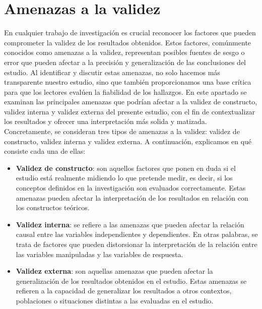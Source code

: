 \section{Amenazas a la validez}
En cualquier trabajo de investigación es crucial reconocer los factores que pueden comprometer
la validez de los resultados obtenidos. Estos factores, comúnmente conocidos como amenazas a la
validez, representan posibles fuentes de sesgo o error que pueden afectar a la precisión y
generalización de las conclusiones del estudio. Al identificar y discutir estas amenazas, no solo
hacemos más transparente nuestro estudio, sino que también proporcionamos una base crítica para
que los lectores evalúen la fiabilidad de los hallazgos. En este apartado se examinan las
principales amenazas que podrían afectar a la validez de constructo, validez interna y validez
externa del presente estudio, con el fin de contextualizar los resultados y ofrecer una
interpretación más solida y matizada.\\

Concretamente, se consideran tres tipos de amenazas a la validez: validez de constructo, validez
interna y validez externa. A continuación, explicamos en qué consiste cada una de ellas:

\begin{itemize}
    \item \textbf{Validez de constructo}: son aquellos factores que ponen en duda si el estudio
    está realmente midiendo lo que pretende medir, es decir, si los conceptos definidos en la
    investigación son evaluados correctamente. Estas amenazas pueden afectar la interpretación
    de los resultados en relación con los constructos teóricos.\\

    \item \textbf{Validez interna}: se refiere a las amenazas que pueden afectar la relación
    causal entre las variables independientes y dependientes. En otras palabras, se trata de
    factores que pueden distorsionar la interpretación de la relación entre las variables
    manipuladas y las variables de respuesta.\\

    \item \textbf{Validez externa}: son aquellas amenazas que pueden afectar la generalización de
    los resultados obtenidos en el estudio. Estas amenazas se refieren a la capacidad de
    generalizar los resultados a otros contextos, poblaciones o situaciones distintas a las
    evaluadas en el estudio.
\end{itemize}

